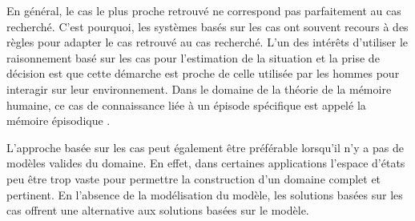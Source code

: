 \documentclass[a4paper,11pt,twoside]{StyleThese}
\begin{document}
En général, le cas le plus proche retrouvé ne correspond pas parfaitement au cas recherché. C'est pourquoi, les systèmes basés sur les cas ont souvent recours à des règles pour adapter le cas retrouvé au cas recherché.
L'un des intérêts d'utiliser le raisonnement basé sur les cas pour l'estimation de la situation et la prise de décision est que cette démarche est proche de celle utilisée par les hommes pour interagir sur leur environnement. Dans le domaine de la théorie de la mémoire humaine, ce cas de connaissance liée à un épisode spécifique est appelé la mémoire épisodique \cite{tulving1972episodic}.

L'approche basée sur les cas peut également être préférable lorsqu'il n'y a pas de modèles valides du domaine. En effet, dans certaines applications l'espace d'états peu être trop vaste pour permettre la construction d'un domaine complet et pertinent. En l'absence de la modélisation du modèle, les solutions basées sur les cas offrent une alternative aux solutions basées sur le modèle.





\end{document}
